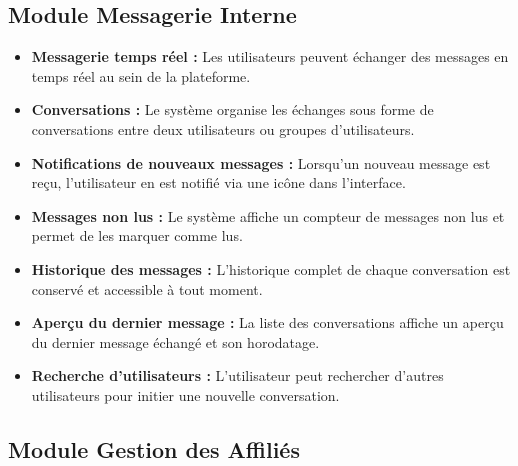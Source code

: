 \documentclass[a4paper,12pt]{report}
\begin{document}
\subsection{Module Messagerie Interne}

\begin{itemize}
    \item \textbf{Messagerie temps réel :} Les utilisateurs peuvent échanger des messages en temps réel au sein de la plateforme.
    \item \textbf{Conversations :} Le système organise les échanges sous forme de conversations entre deux utilisateurs ou groupes d'utilisateurs.
    \item \textbf{Notifications de nouveaux messages :} Lorsqu'un nouveau message est reçu, l'utilisateur en est notifié via une icône dans l'interface.
    \item \textbf{Messages non lus :} Le système affiche un compteur de messages non lus et permet de les marquer comme lus.
    \item \textbf{Historique des messages :} L'historique complet de chaque conversation est conservé et accessible à tout moment.
    \item \textbf{Aperçu du dernier message :} La liste des conversations affiche un aperçu du dernier message échangé et son horodatage.
    \item \textbf{Recherche d'utilisateurs :} L'utilisateur peut rechercher d'autres utilisateurs pour initier une nouvelle conversation.
\end{itemize}

\subsection{Module Gestion des Affiliés}
\end{document}
